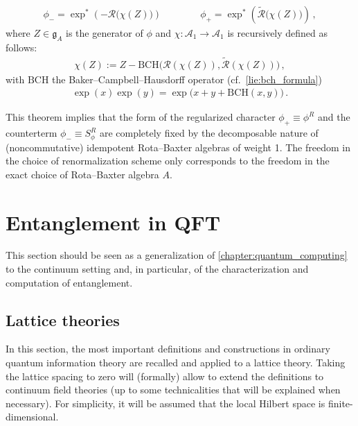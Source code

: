 \begin{theorem}
\begin{itemize}
            \begin{gather}
                \phi_- = \exp^*\left(-\mathcal{R}\bigl(\chi(Z)\bigr)\right) \qquad\qquad \phi_+ = \exp^*\left(\widetilde{\mathcal{R}}\bigl(\chi(Z)\bigr)\right)\,,
            \end{gather}
            where $Z\in\mathfrak{g}_A$ is the generator of $\phi$ and $\chi:\mathcal{A}_1\rightarrow\mathcal{A}_1$ is recursively defined as follows:
            \begin{gather}
                \chi(Z) := Z - \mathrm{BCH}\bigl(\mathcal{R}(\chi(Z)),\widetilde{\mathcal{R}}(\chi(Z))\bigr)\,,
            \end{gather}
            with $\mathrm{BCH}$ the Baker--Campbell--Hausdorff operator (cf.~\cref{lie:bch_formula})
            \begin{gather}
                \exp(x)\exp(y) = \exp\bigl(x+y+\mathrm{BCH}(x,y)\bigr)\,.
            \end{gather}
        \end{itemize}
    \end{theorem}

    This theorem implies that the form of the regularized character $\phi_+\equiv\phi^R$ and the counterterm $\phi_-\equiv S_\phi^R$ are completely fixed by the decomposable nature of (noncommutative) idempotent Rota--Baxter algebras of weight 1. The freedom in the choice of renormalization scheme only corresponds to the freedom in the exact choice of Rota--Baxter algebra $A$.

\section{Entanglement in QFT}

    This section should be seen as a generalization of \cref{chapter:quantum_computing} to the continuum setting and, in particular, of the characterization and computation of entanglement.

\subsection{Lattice theories}

    In this section, the most important definitions and constructions in ordinary quantum information theory are recalled and applied to a lattice theory. Taking the lattice spacing to zero will (formally) allow to extend the definitions to continuum field theories (up to some technicalities that will be explained when necessary). For simplicity, it will be assumed that the local Hilbert space is finite-dimensional.

